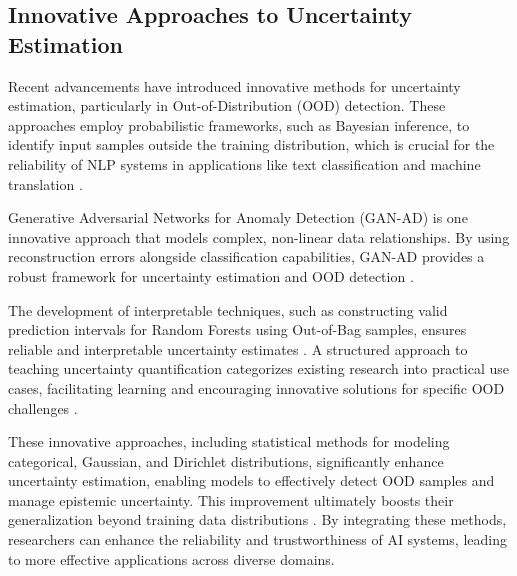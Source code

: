 
\subsection{Innovative Approaches to Uncertainty Estimation} \label{subsec:Innovative Approaches to Uncertainty Estimation}

Recent advancements have introduced innovative methods for uncertainty estimation, particularly in Out-of-Distribution (OOD) detection. These approaches employ probabilistic frameworks, such as Bayesian inference, to identify input samples outside the training distribution, which is crucial for the reliability of NLP systems in applications like text classification and machine translation \cite{lang2023survey,Out-of-Dis0,valdenegrotoro2021teachinguncertaintyquantificationmachine}.

Generative Adversarial Networks for Anomaly Detection (GAN-AD) is one innovative approach that models complex, non-linear data relationships. By using reconstruction errors alongside classification capabilities, GAN-AD provides a robust framework for uncertainty estimation and OOD detection \cite{li2019anomalydetectiongenerativeadversarial}.

The development of interpretable techniques, such as constructing valid prediction intervals for Random Forests using Out-of-Bag samples, ensures reliable and interpretable uncertainty estimates \cite{ramosaj2021interpretablemachinesconstructingvalid}. A structured approach to teaching uncertainty quantification categorizes existing research into practical use cases, facilitating learning and encouraging innovative solutions for specific OOD challenges \cite{valdenegrotoro2021teachinguncertaintyquantificationmachine}.

These innovative approaches, including statistical methods for modeling categorical, Gaussian, and Dirichlet distributions, significantly enhance uncertainty estimation, enabling models to effectively detect OOD samples and manage epistemic uncertainty. This improvement ultimately boosts their generalization beyond training data distributions \cite{valdenegrotoro2021teachinguncertaintyquantificationmachine}. By integrating these methods, researchers can enhance the reliability and trustworthiness of AI systems, leading to more effective applications across diverse domains.










